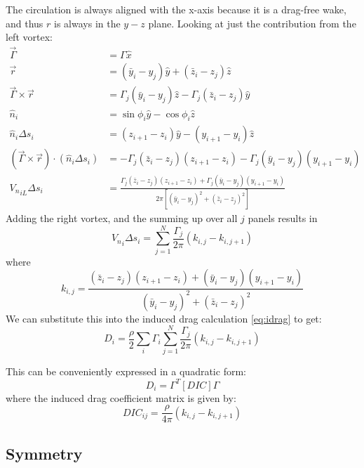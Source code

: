 \documentclass{article}
\begin{document}
The circulation is always aligned with the x-axis because it is a drag-free wake, and thus $r$ is always in the $y-z$ plane. Looking at just the contribution from the left vortex:
\begin{align}
    \vec\Gamma &= \Gamma \hat{x}\\
    \vec r &= (\bar{y}_i - y_j) \hat{y} + (\bar{z}_i - z_j) \hat{z}\\
    \vec\Gamma \times \vec{r} &= \Gamma_j (\bar{y}_i - y_j) \hat{z} - \Gamma_j (\bar{z}_i - z_j) \hat{y}\\
    \hat{n}_i &= \sin\phi_i \hat{y} - \cos\phi_i \hat{z}\\
    \hat{n}_i \Delta s_i &= (z_{i+1} - z_i) \hat{y} - (y_{i+1} - y_i) \hat{z}\\
    (\vec\Gamma \times \vec{r}) \cdot (\hat{n}_i \Delta s_i) &= - \Gamma_j (\bar{z}_i - z_j)(z_{i+1} - z_i) - \Gamma_j (\bar{y}_i - y_j)(y_{i+1} - y_i)\\
    {V_n}_{iL} \Delta s_i &= \frac{\Gamma_j (\bar{z}_i - z_j)(z_{i+1} - z_i) + \Gamma_j (\bar{y}_i - y_j)(y_{i+1} - y_i)}{2 \pi [(\bar{y}_i - y_j)^2 + (\bar{z}_i - z_j)^2]}
\end{align}
Adding the right vortex, and the summing up over all $j$ panels results in 
\begin{equation}
{V_n}_i \Delta s_i = \sum_{j=1}^N \frac{\Gamma_j}{2\pi} \left( k_{i,j} - k_{i, j+1}\right)
\end{equation}
where
\begin{equation}
k_{i,j} = \frac{(\bar z_i - z_j) (z_{i+1} - z_i) + (\bar y_i - y_j) (y_{i+1} - y_i)}{(\bar y_i - y_j)^2 + (\bar z_i - z_j)^2} 
\end{equation}
We can substitute this into the induced drag calculation \cref{eq:idrag} to get:
\begin{equation}
D_i = \frac{\rho}{2} \sum_i \Gamma_i \sum_{j=1}^N \frac{\Gamma_j}{2\pi} \left( k_{i,j} - k_{i, j+1}\right)
\end{equation}

This can be conveniently expressed in a quadratic form:
\begin{equation}
D_i = \Gamma^T [DIC] \Gamma
\end{equation}
where the induced drag coefficient matrix is given by:
\begin{equation}
DIC_{ij} = \frac{\rho}{4\pi} \left(k_{i,j} - k_{i, j+1}\right)
\end{equation}

\subsection{Symmetry}
\end{document}
